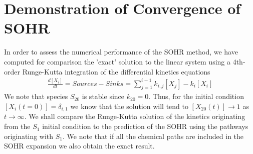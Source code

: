 \section{Demonstration of Convergence of SOHR}
\label{ch2dot5:sec:convergence}
In order to assess the numerical performance of the SOHR method, we have
computed for comparison the 'exact' solution to the linear system using a 4th-order
Runge-Kutta integration of the differential kinetics equations
\begin{eqnarray}
\label{ch2dot5:eqn2}
\frac{d [X_i]}{dt} = Sources - Sinks = \sum_{j=1}^{i-1}{k_{i,j}[X_j] - k_i[X_i]}
\end{eqnarray}
We note that species $S_{20}$ is stable since $k_{20} = 0$. Thus, for the initial condition
$[X_i(t = 0)] = \delta_{i,1}$ we know that the solution will tend to $[X_{20}(t)] \rightarrow 1$ as $t \rightarrow \infty$. We
shall compare the Runge-Kutta solution of the kinetics originating from the $S_1$ initial
condition to the prediction of the SOHR using the pathways originating with $S_1$. We
note that if all the chemical paths are included in the SOHR expansion we also obtain
the exact result.
\newline
